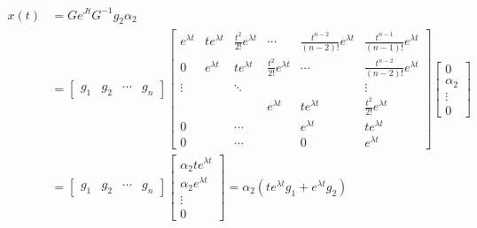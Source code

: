 \documentclass[twoside]{article}
\begin{document}
\begin{align*}
    x(t) &= G e^{J t} G^{-1} g_2 \alpha_2
    \\ &= \begin{bmatrix} g_1 & g_2 & \cdots & g_n \end{bmatrix} 
\begin{bmatrix} e^{\lambda t} & t e^{\lambda t} & \frac{t^2}{2 !} e^{\lambda t} & \cdots & \frac{t^{n-2}}{(n-2) !} e^{\lambda t}  & \frac{t^{n-1}}{(n-1) !} e^{\lambda t} \\
0 & e^{\lambda t} & t e^{\lambda t} & \frac{t^2}{2 !} e^{\lambda t} & \cdots  & \frac{t^{n-2}}{(n-2) !} e^{\lambda t} \\
\vdots & & \ddots & & & \vdots \\
& & & e^{\lambda t} & t e^{\lambda t} & \frac{t^2}{2 !} e^{\lambda t} \\
0 & & \cdots & & e^{\lambda t} & t e^{\lambda t} \\
0 & & \cdots & & 0 & e^{\lambda t} \end{bmatrix}
%
    \begin{bmatrix} 0 \\ \alpha_2 \\ \vdots \\ 0 \end{bmatrix} 
    \\[1ex] 
    &= \begin{bmatrix} g_1 & g_2 & \cdots & g_n \end{bmatrix} \begin{bmatrix} \alpha_2 t e^{\lambda t} \\ \alpha_2 e^{\lambda t} \\ \vdots \\ 0 \end{bmatrix} = \alpha_2 \left( t e^{\lambda t} g_1  + e^{\lambda t} g_2 \right)
\end{align*}
%
\end{document}
